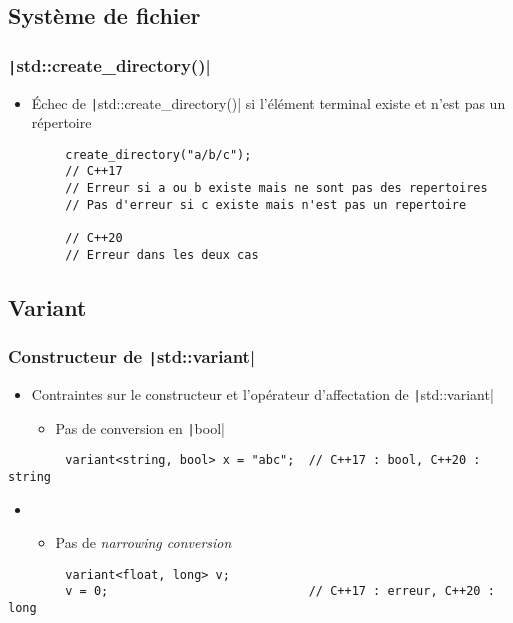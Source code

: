 \documentclass[C++.tex]{subfiles}
\begin{document}
\subsection*{Système de fichier}
\begin{frame}[fragile]
	\frametitle{\texttt|std::create_directory()|}
	\begin{itemize}
		\item Échec de \texttt|std::create_directory()| si l'élément terminal existe et n'est pas un répertoire
	\end{itemize}

	\begin{verbatim}
		create_directory("a/b/c");
		// C++17
		// Erreur si a ou b existe mais ne sont pas des repertoires
		// Pas d'erreur si c existe mais n'est pas un repertoire

		// C++20
		// Erreur dans les deux cas
	\end{verbatim}
\end{frame}

\subsection*{Variant}
\begin{frame}[fragile]
	\frametitle{Constructeur de \texttt|std::variant|}
	\begin{itemize}
		\item Contraintes sur le constructeur et l'opérateur d'affectation de \texttt|std::variant|
		\begin{itemize}
			\item Pas de conversion en \texttt|bool|
		\end{itemize}
	\end{itemize}

	\begin{verbatim}
		variant<string, bool> x = "abc";  // C++17 : bool, C++20 : string
	\end{verbatim}

	\begin{itemize}
		\item [] \begin{itemize}
			\item Pas de \textit{narrowing conversion}
		\end{itemize}
	\end{itemize}

	\begin{verbatim}
		variant<float, long> v;
		v = 0;                            // C++17 : erreur, C++20 : long
	\end{verbatim}
\end{frame}
\end{document}
